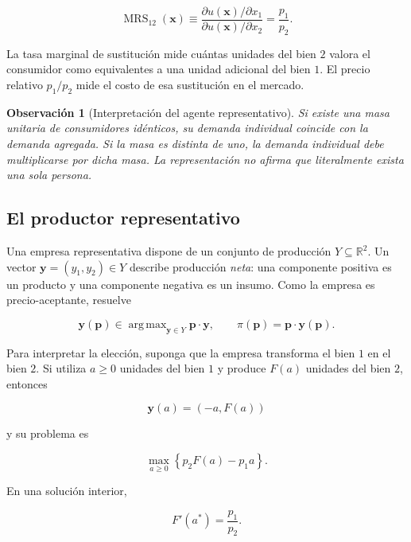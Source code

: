 \documentclass[12pt]{article}
\theoremstyle{cideplain}
\theoremstyle{cidedef}
\newtheorem{remark}[theorem]{Observación}
\DeclareMathOperator*{\argmax}{arg\,max}
\DeclareMathOperator{\MRS}{MRS}
\newcommand{\R}{\mathbb{R}}
\newcommand{\p}{\bm p}
\newcommand{\x}{\bm x}
\newcommand{\y}{\bm y}
\begin{document}
\begin{equation}
  \MRS_{12}(\x)
  \equiv
  \frac{\partial u(\x)/\partial x_1}
       {\partial u(\x)/\partial x_2}
  =
  \frac{p_1}{p_2}.
  \label{eq:rep-consumer-foc}
\end{equation}

La tasa marginal de sustitución mide cuántas unidades del bien \(2\) valora el consumidor
como equivalentes a una unidad adicional del bien \(1\). El precio relativo \(p_1/p_2\)
mide el costo de esa sustitución en el mercado.

\begin{remark}[Interpretación del agente representativo]
Si existe una masa unitaria de consumidores idénticos, su demanda individual coincide con
la demanda agregada. Si la masa es distinta de uno, la demanda individual debe multiplicarse
por dicha masa. La representación no afirma que literalmente exista una sola persona.
\end{remark}

\subsection{El productor representativo}

Una empresa representativa dispone de un conjunto de producción
\(Y\subseteq\R^2\). Un vector \(\y=(y_1,y_2)\in Y\) describe producción
\emph{neta}: una componente positiva es un producto y una componente negativa es un insumo.
Como la empresa es precio-aceptante, resuelve

\begin{equation}
  \y(\p)
  \in
  \argmax_{\y\in Y}\p\cdot\y,
  \qquad
  \pi(\p)=\p\cdot\y(\p).
  \label{eq:rep-firm}
\end{equation}

Para interpretar la elección, suponga que la empresa transforma el bien \(1\) en el bien
\(2\). Si utiliza \(a\geq0\) unidades del bien \(1\) y produce \(F(a)\) unidades del bien
\(2\), entonces

\[
  \y(a)=(-a,F(a))
\]

y su problema es

\begin{equation}
  \max_{a\geq0}\left\{p_2F(a)-p_1a\right\}.
  \label{eq:transformation-firm}
\end{equation}

En una solución interior,

\begin{equation}
  F'(a^*)=\frac{p_1}{p_2}.
  \label{eq:firm-foc}
\end{equation}
\end{document}

